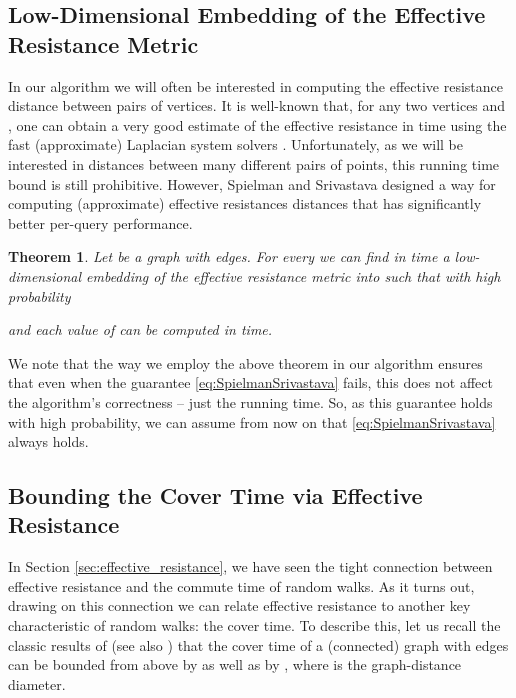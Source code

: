 \documentclass[11pt, letterpaper]{article}
\newtheorem{theorem}{Theorem}[section]
\begin{document}
\subsection{Low-Dimensional Embedding of the Effective Resistance Metric} \label{sec:reff_embedding}

In our algorithm we will often be interested in computing the effective resistance distance between pairs of vertices. It is well-known that, for any two vertices  and , one can obtain a very good estimate of the effective resistance  in  time using the fast (approximate) Laplacian system solvers \cite{SpielmanT03,SpielmanT04,KoutisMP10,KoutisMP11,KelnerOSZ13}. Unfortunately, as we will be interested in distances between many different pairs of points, this running time bound is still prohibitive. However, Spielman and Srivastava \cite{SpielmanS08} designed a way for computing (approximate) effective resistances distances that has significantly better per-query performance. 
\begin{theorem}
\label{thm:SpielmanSrivastava}
Let  be a graph with  edges. For every  we can find in  time a low-dimensional embedding  of the effective resistance metric into  such that with high probability

and each value of  can be computed in  time.
\end{theorem} 
We note that the way we employ the above theorem in our algorithm ensures that even when the guarantee \eqref{eq:SpielmanSrivastava} fails, this does not affect the algorithm's correctness -- just the running time. So, as this guarantee holds with high probability, we can assume from now on that \eqref{eq:SpielmanSrivastava} always holds. 



\subsection{Bounding the Cover Time via Effective Resistance}
\label{sec:cover_time_and_effective_resistance}

In Section \ref{sec:effective_resistance}, we have seen the tight connection between effective resistance and the commute time of random walks. As it turns out, drawing on this connection we can relate effective resistance to another key characteristic of random walks: the cover time. To describe this, let us recall the classic results of \cite{AleliunasKLLR79} (see also \cite{Lovasz93}) that the cover time  of a (connected) graph with  edges can be bounded from above by  as well as by , where  is the graph-distance diameter.
\end{document}
